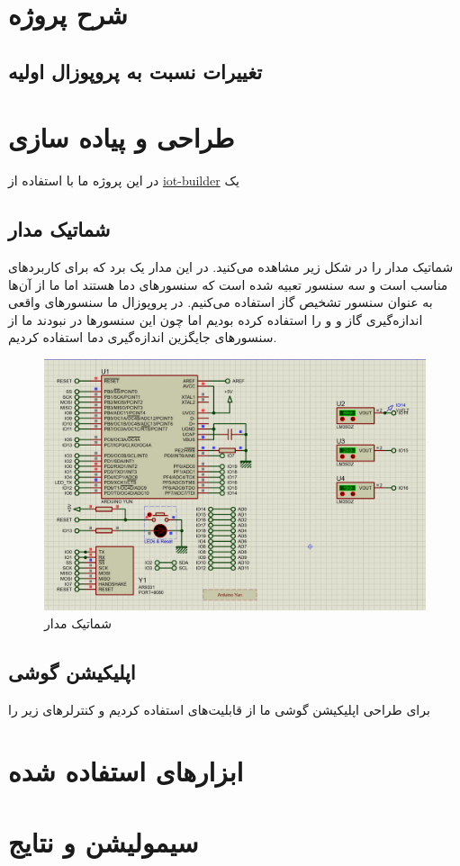 \section{شرح پروژه}

\subsection{تغییرات نسبت به پروپوزال اولیه}

\section{طراحی و پیاده سازی}
در این پروژه ما با استفاده از 
\href{https://labcenter.s3.amazonaws.com/downloads/iotHelp.pdf}{iot-builder}
یک 
\subsection{شماتیک مدار}
شماتیک مدار را در شکل زیر مشاهده می‌کنید. در این مدار یک برد 
که برای کاربرد‌های 
مناسب است و سه سنسور
تعبیه شده است که سنسور‌های دما هستند اما ما از آن‌ها به عنوان سنسور تشخیص گاز استفاده می‌کنیم. در پروپوزال ما سنسور‌های واقعی اندازه‌گیری گاز 
و 
و
را استفاده کرده بودیم اما چون این سنسور‌ها در 
نبودند ما از سنسور‌های جایگزین اندازه‌گیری دما استفاده کردیم.
\begin{figure}[h!]
	\centering		
	\includegraphics[width=\linewidth]{figs/circuit.png}
	\caption{شماتیک مدار}
\end{figure}

\subsection{اپلیکیشن گوشی}
برای طراحی اپلیکیشن گوشی ما از قابلیت‌های 
استفاده کردیم و کنترلر‌های 
زیر را 
\subsection{}


\section{ابزار‌های استفاده شده}


\section{سیمولیشن و نتایج}


